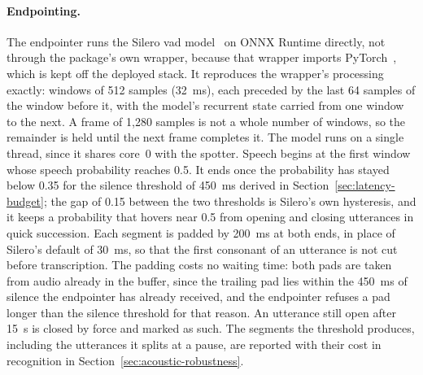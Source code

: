 \paragraph{Endpointing.} The endpointer runs the Silero \gls{vad} model~\cite{silero} on ONNX
Runtime directly, not through the package's own wrapper, because that wrapper imports
PyTorch~\cite{pytorch}, which is kept off the deployed stack. It reproduces the wrapper's
processing exactly: windows of 512 samples (32~ms), each preceded by the last 64 samples of the
window before it, with the model's recurrent state carried from one window to the next. A frame of
1{,}280 samples is not a whole number of windows, so the remainder is held until the next frame
completes it. The model runs on a single thread, since it shares core~0 with the spotter. Speech
begins at the first window whose speech probability reaches 0.5. It ends once the probability has
stayed below 0.35 for the silence threshold of 450~ms derived in Section~\ref{sec:latency-budget};
the gap of 0.15 between the two thresholds is Silero's own hysteresis, and it keeps a probability
that hovers near 0.5 from opening and closing utterances in quick succession. Each segment is
padded by 200~ms at both ends, in place of Silero's default of 30~ms, so that the first consonant
of an utterance is not cut before transcription. The padding costs no waiting time: both pads are
taken from audio already in the buffer, since the trailing pad lies within the 450~ms of silence
the endpointer has already received, and the endpointer refuses a pad longer than the silence
threshold for that reason. An utterance still open after 15~s is closed by force and marked as
such. The segments the threshold produces, including the utterances it splits at a pause, are
reported with their cost in recognition in Section~\ref{sec:acoustic-robustness}.

